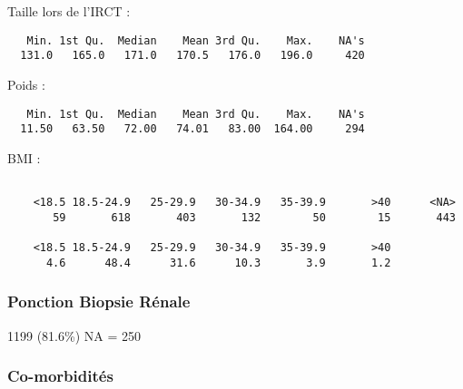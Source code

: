\documentclass[11pt,a4paper]{article}\usepackage[]{graphicx}\usepackage[]{color}
\makeatletter
\newenvironment{kframe}{%
 \def\at@end@of@kframe{}%
 \ifinner\ifhmode%
  \def\at@end@of@kframe{\end{minipage}}%
  \begin{minipage}{\columnwidth}%
 \fi\fi%
 \def\FrameCommand##1{\hskip\@totalleftmargin \hskip-\fboxsep
 \colorbox{shadecolor}{##1}\hskip-\fboxsep
     \hskip-\linewidth \hskip-\@totalleftmargin \hskip\columnwidth}%
 \MakeFramed {\advance\hsize-\width
   \@totalleftmargin\z@ \linewidth\hsize
   \@setminipage}}%
 {\par\unskip\endMakeFramed%
 \at@end@of@kframe}
\newenvironment{knitrout}{}{} %
\makeatother
\begin{document}
Taille lors de l'IRCT :
  
\begin{knitrout}
\color{fgcolor}\begin{kframe}
\begin{verbatim}
   Min. 1st Qu.  Median    Mean 3rd Qu.    Max.    NA's 
  131.0   165.0   171.0   170.5   176.0   196.0     420 
\end{verbatim}
\end{kframe}
\end{knitrout}

Poids :

\begin{knitrout}
\color{fgcolor}\begin{kframe}
\begin{verbatim}
   Min. 1st Qu.  Median    Mean 3rd Qu.    Max.    NA's 
  11.50   63.50   72.00   74.01   83.00  164.00     294 
\end{verbatim}
\end{kframe}
\end{knitrout}

BMI :

\begin{knitrout}
\color{fgcolor}\begin{kframe}
\begin{verbatim}

    <18.5 18.5-24.9   25-29.9   30-34.9   35-39.9       >40      <NA> 
       59       618       403       132        50        15       443 

    <18.5 18.5-24.9   25-29.9   30-34.9   35-39.9       >40 
      4.6      48.4      31.6      10.3       3.9       1.2 
\end{verbatim}
\end{kframe}
\end{knitrout}

      \subsubsection{Ponction Biopsie Rénale}

1199 (81.6\%) NA = 250

      \subsubsection{Co-morbidités}
\end{document}
